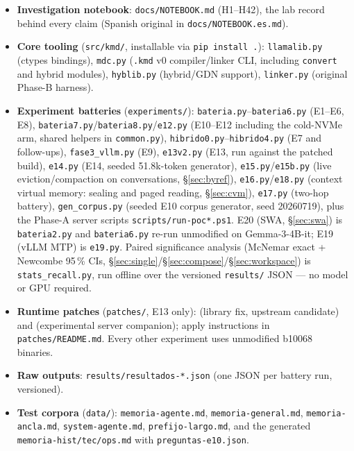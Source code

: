\documentclass[11pt]{article}
\newcommand{\kmd}{\texttt{.kmd}}
\newcommand{\code}[1]{\texttt{#1}}
\begin{document}
\begin{itemize}\sloppy
  \item \textbf{Investigation notebook}: \code{docs/NOTEBOOK.md} (H1--H42), the lab record behind every claim (Spanish original in \code{docs/NOTEBOOK.es.md}).
  \item \textbf{Core tooling} (\code{src/kmd/}, installable via \code{pip install .}): \code{llamalib.py} (ctypes bindings), \code{mdc.py} (\kmd{} v0 compiler/linker CLI, including \code{convert} and hybrid modules), \code{hyblib.py} (hybrid/GDN support), \code{linker.py} (original Phase-B harness).
  \item \textbf{Experiment batteries} (\code{experiments/}): \code{bateria.py}--\code{bateria6.py} (E1--E6, E8), \code{bateria7.py}/\code{bateria8.py}/\code{e12.py} (E10--E12 including the cold-NVMe arm, shared helpers in \code{common.py}), \code{hibrido0.py}--\code{hibrido4.py} (E7 and follow-ups), \code{fase3\_vllm.py} (E9), \code{e13v2.py} (E13, run against the patched build), \code{e14.py} (E14, seeded 51.8k-token generator), \code{e15.py}/\code{e15b.py} (live eviction/compaction on conversations, \S\ref{sec:byref}), \code{e16.py}/\code{e18.py} (context virtual memory: sealing and paged reading, \S\ref{sec:cvm}), \code{e17.py} (two-hop battery), \code{gen\_corpus.py} (seeded E10 corpus generator, seed 20260719), plus the Phase-A server scripts \code{scripts/run-poc*.ps1}. E20 (SWA, \S\ref{sec:swa}) is \code{bateria2.py} and \code{bateria6.py} re-run unmodified on Gemma-3-4B-it; E19 (vLLM MTP) is \code{e19.py}. Paired significance analysis (McNemar exact + Newcombe 95\,\% CIs, \S\ref{sec:single}/\S\ref{sec:compose}/\S\ref{sec:workspace}) is \code{stats\_recall.py}, run offline over the versioned \code{results/} JSON --- no model or GPU required.
  \item \textbf{Runtime patches} (\code{patches/}, E13 only):  (library fix, upstream candidate) and  (experimental server companion); apply instructions in \code{patches/README.md}. Every other experiment uses unmodified b10068 binaries.
  \item \textbf{Raw outputs}: \code{results/resultados-*.json} (one JSON per battery run, versioned).
  \item \textbf{Test corpora} (\code{data/}): \code{memoria-agente.md}, \code{memoria-general.md}, \code{memoria-ancla.md}, \code{system-agente.md}, \code{prefijo-largo.md}, and the generated \code{memoria-hist/tec/ops.md} with \code{preguntas-e10.json}.

\end{itemize}
\end{document}
